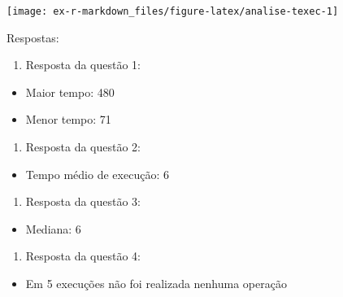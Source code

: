 \documentclass[
]{article}
\newenvironment{Shaded}{\begin{snugshade}}{\end{snugshade}}
\newcommand{\CommentTok}[1]{\textcolor[rgb]{0.56,0.35,0.01}{\textit{#1}}}
\newcommand{\FunctionTok}[1]{\textcolor[rgb]{0.00,0.00,0.00}{#1}}
\newcommand{\NormalTok}[1]{#1}
\newcommand{\SpecialCharTok}[1]{\textcolor[rgb]{0.00,0.00,0.00}{#1}}
\providecommand{\tightlist}{%
  \setlength{\itemsep}{0pt}\setlength{\parskip}{0pt}}
\begin{document}
\begin{Shaded}
\end{Shaded}

\begin{center}\texttt{[image: ex-r-markdown\_files/figure-latex/analise-texec-1]} \end{center}

Respostas:

\begin{enumerate}
\def\labelenumi{\arabic{enumi}.}
\tightlist
\item
  Resposta da questão 1:
\end{enumerate}

\begin{itemize}
\tightlist
\item
  Maior tempo: 480
\item
  Menor tempo: 71
\end{itemize}

\begin{enumerate}
\def\labelenumi{\arabic{enumi}.}
\setcounter{enumi}{1}
\tightlist
\item
  Resposta da questão 2:
\end{enumerate}

\begin{itemize}
\tightlist
\item
  Tempo médio de execução: 6
\end{itemize}

\begin{enumerate}
\def\labelenumi{\arabic{enumi}.}
\setcounter{enumi}{2}
\tightlist
\item
  Resposta da questão 3:
\end{enumerate}

\begin{itemize}
\tightlist
\item
  Mediana: 6
\end{itemize}

\begin{enumerate}
\def\labelenumi{\arabic{enumi}.}
\setcounter{enumi}{3}
\tightlist
\item
  Resposta da questão 4:
\end{enumerate}

\begin{itemize}
\tightlist
\item
  Em 5 execuções não foi realizada nenhuma operação
\end{itemize}
\end{document}
